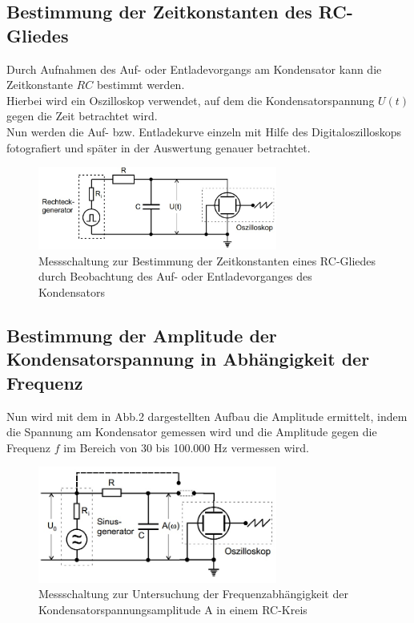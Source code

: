 \subsection{Bestimmung der Zeitkonstanten des RC-Gliedes}
Durch Aufnahmen des Auf- oder Entladevorgangs am Kondensator kann
die Zeitkonstante $RC$ bestimmt werden.\\
Hierbei wird ein Oszilloskop verwendet, auf dem die Kondensatorspannung $U(t)$ gegen die Zeit betrachtet wird. \\
Nun werden die Auf- bzw. Entladekurve einzeln mit Hilfe des Digitaloszilloskops fotografiert und später in der Auswertung genauer betrachtet.
\begin{figure}[h]
  \centering
  \includegraphics[width=0.7\textwidth]{Grafiken/V353_Abb1.jpg}
  \caption{Messschaltung zur Bestimmung der Zeitkonstanten eines RC-Gliedes durch Beobachtung des 
  Auf- oder Entladevorganges des Kondensators \cite{Versuchsaufbau}}
  \label{fig:V353_Abb1}
\end{figure}
\subsection{Bestimmung der Amplitude der Kondensatorspannung in Abhängigkeit der Frequenz}

Nun wird mit dem in Abb.2 dargestellten Aufbau die Amplitude ermittelt, indem die Spannung am Kondensator gemessen wird und die Amplitude gegen die Frequenz $f$ im Bereich von 30 bis 100.000 Hz vermessen wird.

\begin{figure}[h]
  \centering
  \includegraphics[width=0.7\textwidth]{Grafiken/V353_Abb2.jpg}
  \caption{Messschaltung zur Untersuchung der Frequenzabhängigkeit der Kondensatorspannungsamplitude A in einem RC-Kreis \cite{Versuchsaufbau}}
  \label{fig:V353_Abb2}
\end{figure}
